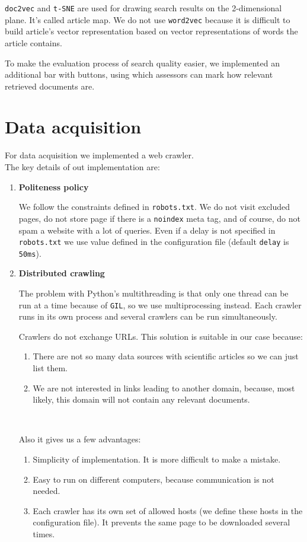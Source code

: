 \texttt{doc2vec} and \texttt{t-SNE} are used for drawing search results on the 2-dimensional plane. It's called article map. We do not use \texttt{word2vec} because it is difficult to build article's vector representation based on vector representations of words the article contains.

To make the evaluation process of search quality easier, we implemented an additional bar with buttons, using which assessors can mark how relevant retrieved documents are.  


\section{Data acquisition}
For data acquisition we implemented a web crawler. \\
The key details of out implementation are:
\begin{enumerate}
    \item
        \textbf{Politeness policy}
        
        We follow the constraints defined in \texttt{robots.txt}.
        We do not visit excluded pages, do not store page if there is a \texttt{noindex} meta tag, and of course, do not spam a website with a lot of queries.
        Even if a delay is not specified in \texttt{robots.txt} we use value defined in the configuration file (default \texttt{delay} is \texttt{50ms}).

    \item
        \textbf{Distributed crawling}
        
        The problem with Python's multithreading is that only one thread can be run at a time because of \texttt{GIL}, so we use multiprocessing instead.
        Each crawler runs in its own process and several crawlers can be run simultaneously.

		Crawlers do not exchange URLs. This solution is suitable in our case because:
		\begin{enumerate}
            \item
                There are not so many data sources with scientific articles so we can just list them.
            \item
            	We are not interested in links leading to another domain, because, most likely, this domain will not contain any relevant documents.
        \end{enumerate}
		\

		Also it gives us a few advantages:
		\begin{enumerate}
			\item Simplicity of implementation. It is more difficult to make a mistake.
			\item Easy to run on different computers, because communication is not needed.
			\item Each crawler has its own set of allowed hosts (we define these hosts in the configuration file). It prevents the same page to be downloaded several times.
		\end{enumerate}

\end{enumerate}

